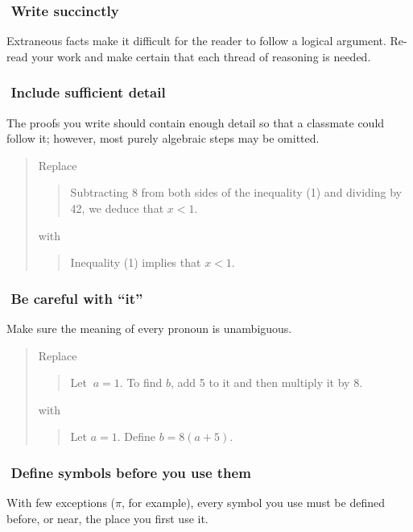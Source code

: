 \documentclass[12pt,fleqn]{article}
\newcounter{ex}\setcounter{ex}{0}
\newcommand{\ex}{%
\hspace{-0.2in} \setcounter{ex}{\value{ex}+1}
\theex \,\,}
\newcounter{id}\setcounter{id}{0}
\newcounter{se}\setcounter{se}{0}
\begin{document}
\subsubsection*{\ex  Write succinctly}  

Extraneous facts make it difficult for the reader to follow a logical
argument.  Re-read your work and make certain that each thread of
reasoning is needed.

\subsubsection*{\ex  Include sufficient detail}  

The proofs you write should contain enough detail so that a 
classmate could  follow it; however,  most purely algebraic 
steps may be omitted. 

\begin{quote}
Replace
\begin{quote}
Subtracting 8 from both sides of the inequality (1)  and dividing by 42,
we deduce that \(x < 1\).
\end{quote}
with
\begin{quote}
Inequality (1) implies that \(x < 1\).
\end{quote}
\end{quote}

\subsubsection*{\ex Be careful with ``it''}

Make sure the meaning of every pronoun is unambiguous.

\begin{quote}
Replace
\begin{quote}
   Let \(\ a = 1\). To find \(b\), add 5 to it and then multiply it by 8.
\end{quote}
with 
\begin{quote}
   Let \(a = 1\).  Define \(b = 8 (a + 5)\).
\end{quote}
\end{quote}

\subsubsection*{\ex Define symbols before you use them}

With few exceptions (\(\pi\), for example), every symbol you use must be defined
before, or near, the place you first use it.
\end{document}
